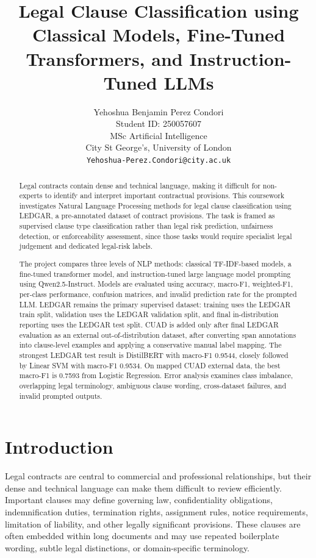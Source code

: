\documentclass[11pt]{article}
\title{Legal Clause Classification using Classical Models, Fine-Tuned Transformers, and Instruction-Tuned LLMs}
\author{
Yehoshua Benjamin Perez Condori \\
Student ID: 250057607 \\
MSc Artificial Intelligence \\
City St George's, University of London \\
\texttt{Yehoshua-Perez.Condori@city.ac.uk}
}
\begin{document}
\maketitle

\begin{abstract}
Legal contracts contain dense and technical language, making it difficult for non-experts to identify and interpret important contractual provisions. This coursework investigates Natural Language Processing methods for legal clause classification using LEDGAR, a pre-annotated dataset of contract provisions. The task is framed as supervised clause type classification rather than legal risk prediction, unfairness detection, or enforceability assessment, since those tasks would require specialist legal judgement and dedicated legal-risk labels.

The project compares three levels of NLP methods: classical TF-IDF-based models, a fine-tuned transformer model, and instruction-tuned large language model prompting using Qwen2.5-Instruct. Models are evaluated using accuracy, macro-F1, weighted-F1, per-class performance, confusion matrices, and invalid prediction rate for the prompted LLM. LEDGAR remains the primary supervised dataset: training uses the LEDGAR train split, validation uses the LEDGAR validation split, and final in-distribution reporting uses the LEDGAR test split. CUAD is added only after final LEDGAR evaluation as an external out-of-distribution dataset, after converting span annotations into clause-level examples and applying a conservative manual label mapping. The strongest LEDGAR test result is DistilBERT with macro-F1 0.9544, closely followed by Linear SVM with macro-F1 0.9534. On mapped CUAD external data, the best macro-F1 is 0.7593 from Logistic Regression. Error analysis examines class imbalance, overlapping legal terminology, ambiguous clause wording, cross-dataset failures, and invalid prompted outputs.
\end{abstract}

\section{Introduction}

Legal contracts are central to commercial and professional relationships, but their dense and technical language can make them difficult to review efficiently. Important clauses may define governing law, confidentiality obligations, indemnification duties, termination rights, assignment rules, notice requirements, limitation of liability, and other legally significant provisions. These clauses are often embedded within long documents and may use repeated boilerplate wording, subtle legal distinctions, or domain-specific terminology.
\end{document}

